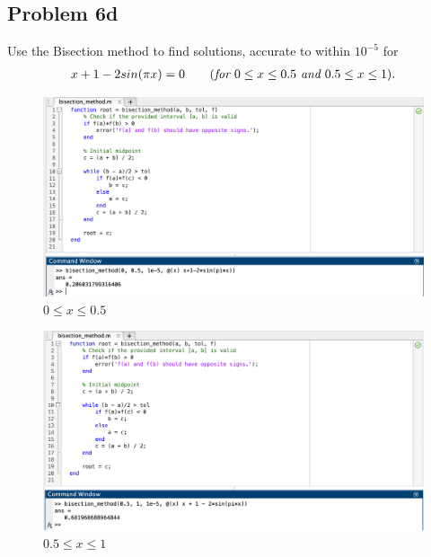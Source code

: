 \documentclass{article}
\begin{document}
\subsection*{Problem 6d}
Use the Bisection method to find solutions, accurate to within $10^{-5}$ for 
\begin{align*}
    x+1-2sin(\pi x) = 0 \qquad (\emph{for $0\le x\le 0.5$ and $0.5 \le x \le 1$}).
\end{align*}
\begin{figure}[htb]
    \qquad
    \begin{minipage}{.4\textwidth}
        \centering
        {\includegraphics[scale=0.2]{first.png}}
        \qquad\qquad\emph{$0\le x\le 0.5$}\label{fig:1}
    \end{minipage}    
    \qquad
    \begin{minipage}{.4\textwidth}
        \centering
        {\includegraphics[scale=0.2]{second.png}}
        \qquad\qquad\emph{$0.5\le x\le 1$}\label{fig:2}
    \end{minipage}        
\end{figure} 
\end{document}
